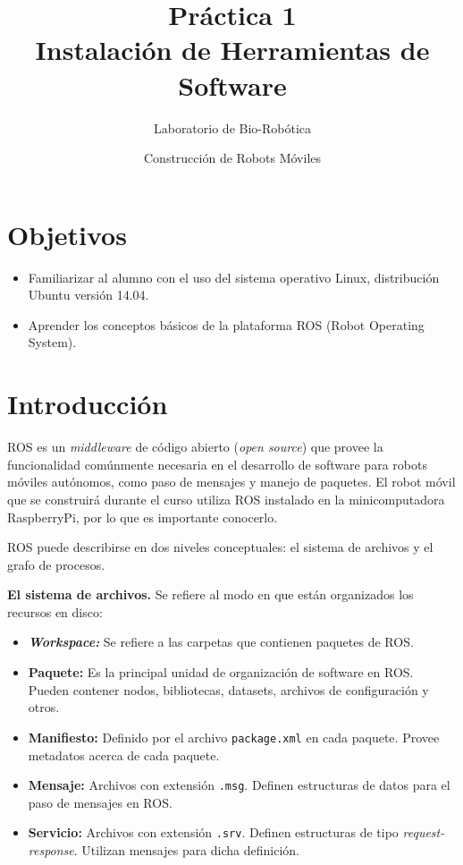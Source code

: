 \documentclass[a4paper,12pt]{article}
\title{Práctica 1 \\ Instalación de Herramientas de Software}
\author{Laboratorio de Bio-Robótica}
\date{Construcción de Robots Móviles}
\begin{document}
\renewcommand{\tablename}{Tabla}
\maketitle
\section*{Objetivos}
\begin{itemize}
\item Familiarizar al alumno con el uso del sistema operativo Linux, distribución Ubuntu versión 14.04.
\item Aprender los conceptos básicos de la plataforma ROS (Robot Operating System).
\end{itemize}
 
\section{Introducción}
ROS es un \textit{middleware} de código abierto (\textit{open source}) que provee la funcionalidad comúnmente necesaria en el desarrollo de software para robots móviles autónomos, como paso de mensajes y manejo de paquetes. El robot móvil que se construirá durante el curso utiliza ROS instalado en la minicomputadora RaspberryPi, por lo que es importante conocerlo.

ROS puede describirse en dos niveles conceptuales: el sistema de archivos y el grafo de procesos.

\textbf{El sistema de archivos.} Se refiere al modo en que están organizados los recursos en disco:
\begin{itemize}
\item \textbf{\textit{Workspace:}} Se refiere a las carpetas que contienen paquetes de ROS.
\item \textbf{Paquete:} Es la principal unidad de organización de software en ROS. Pueden contener nodos, bibliotecas, datasets, archivos de configuración y otros.
\item \textbf{Manifiesto:} Definido por el archivo \texttt{package.xml} en cada paquete. Provee metadatos acerca de cada paquete. 
\item \textbf{Mensaje:} Archivos con extensión \texttt{.msg}. Definen estructuras de datos para el paso de mensajes en ROS.
\item \textbf{Servicio:} Archivos con extensión \texttt{.srv}. Definen estructuras de tipo \textit{request-response}. Utilizan mensajes para dicha definición.
\end{itemize}
\end{document}
